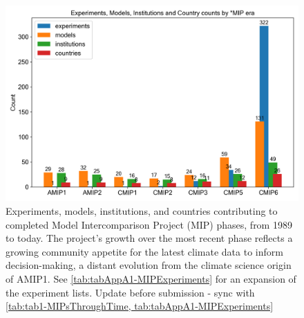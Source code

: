 \documentclass[gmd, preprint]{copernicus}
\def\cred#1{{\color{red}#1}}
\begin{document}
\begin{figure}
    \centering
    \includegraphics[width=1\linewidth]{230512T112843_MIPEvolution-Counts.png}
    \caption{Experiments, models, institutions, and countries contributing to completed Model Intercomparison Project (MIP) phases, from 1989 to today. The project's growth over the most recent phase reflects a growing community appetite for the latest climate data to inform decision-making, a distant evolution from the climate science origin of AMIP1. See \autoref{tab:tabAppA1-MIPExperiments} for an expansion of the experiment lists. \cred{Update before submission - sync with \autoref{tab:tab1-MIPsThroughTime, tab:tabAppA1-MIPExperiments}}}
    \label{fig:fig1-MIPGrowth}
\end{figure}
\end{document}
